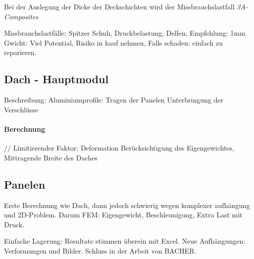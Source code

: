 Bei der Auslegung der Dicke der Deckschichten wird der Missbrauchslastfall
\emph{3A-Composites}



Missbrauchslastfälle: Spitzer Schuh, Druckbelastung, Dellen,
Empfehlung: 1mm Gwicht: Viel Potential, Risiko in kauf nehmen, Falls schaden: einfach zu reparieren.




\subsection{Dach - Hauptmodul}

Beschreibung:
  Aluminiumprofile: Tragen der Panelen
  Unterbringung der Verschlüsse

  \paragraph{Berechnung}\mbox{}//
    Limitierender Faktor: Deformation
    Berücksichtigung des Eigengewichtes,
    Mittragende Breite des Daches


\subsection{Panelen}
  Erste Berechnung wie Dach, dann jedoch schwierig wegen komplexer aufhängung und 2D-Problem.
  Darum FEM:
    Eigengewicht, Beschleunigung, Extra Last mit Druck.

  Einfache Lagerung: Resultate stimmen überein mit Excel.
  Neue Aufhängungen:
    Verformungen und Bilder.
    Schluss in der Arbeit von BACHER.

\newpage
